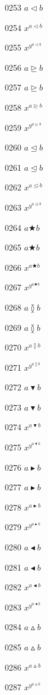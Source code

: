 \documentclass{article}
\begin{document}
0253 $\displaystyle a\vartriangleleft b$\par
0254 $x^{a\vartriangleleft b}$\par
0255 $x^{y^{a\vartriangleleft b}}$\par
0256 $a\trianglerighteq b$\par
0257 $\displaystyle a\trianglerighteq b$\par
0258 $x^{a\trianglerighteq b}$\par
0259 $x^{y^{a\trianglerighteq b}}$\par
0260 $a\trianglelefteq b$\par
0261 $\displaystyle a\trianglelefteq b$\par
0262 $x^{a\trianglelefteq b}$\par
0263 $x^{y^{a\trianglelefteq b}}$\par
0264 $a\bigstar b$\par
0265 $\displaystyle a\bigstar b$\par
0266 $x^{a\bigstar b}$\par
0267 $x^{y^{a\bigstar b}}$\par
0268 $a\between b$\par
0269 $\displaystyle a\between b$\par
0270 $x^{a\between b}$\par
0271 $x^{y^{a\between b}}$\par
0272 $a\blacktriangledown b$\par
0273 $\displaystyle a\blacktriangledown b$\par
0274 $x^{a\blacktriangledown b}$\par
0275 $x^{y^{a\blacktriangledown b}}$\par
0276 $a\blacktriangleright b$\par
0277 $\displaystyle a\blacktriangleright b$\par
0278 $x^{a\blacktriangleright b}$\par
0279 $x^{y^{a\blacktriangleright b}}$\par
0280 $a\blacktriangleleft b$\par
0281 $\displaystyle a\blacktriangleleft b$\par
0282 $x^{a\blacktriangleleft b}$\par
0283 $x^{y^{a\blacktriangleleft b}}$\par
0284 $a\vartriangle b$\par
0285 $\displaystyle a\vartriangle b$\par
0286 $x^{a\vartriangle b}$\par
0287 $x^{y^{a\vartriangle b}}$\par
\end{document}

